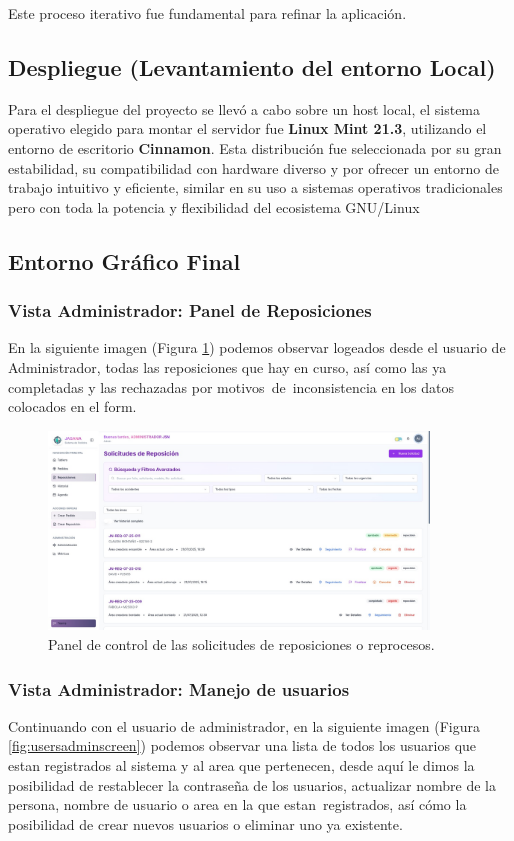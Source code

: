 \documentclass[12pt,letterpaper,spanish]{report}
\begin{document}
Este proceso iterativo fue fundamental para refinar la aplicación.

\subsection{Despliegue (Levantamiento del entorno Local)}
Para el despliegue del proyecto se llevó a cabo sobre un host local, el sistema operativo elegido para montar el servidor fue \textbf{Linux Mint 21.3}, utilizando el entorno de escritorio \textbf{Cinnamon}. Esta distribución fue seleccionada por su gran estabilidad, su compatibilidad con hardware diverso y por ofrecer un entorno de trabajo intuitivo y eficiente, similar en su uso a sistemas operativos tradicionales pero con toda la potencia y flexibilidad del ecosistema GNU/Linux

\subsection{Entorno Gráfico Final}
\subsubsection{Vista Administrador: Panel de Reposiciones}
En la siguiente imagen (Figura \ref{fig:adminscreen}) podemos observar logeados desde el usuario de Administrador, todas las reposiciones que hay en curso, así como las ya completadas y las rechazadas por motivos de inconsistencia en los datos colocados en el form.

\begin{figure}[H]
    \centering
    \includegraphics[width=0.9\textwidth]{pantalla_admin.jpg}
    \caption{Panel de control de las solicitudes de reposiciones o reprocesos.}
    \label{fig:adminscreen}
\end{figure}

\subsubsection{Vista Administrador: Manejo de usuarios}
Continuando con el usuario de administrador, en la siguiente imagen (Figura \ref{fig:usersadminscreen}) podemos observar una lista de todos los usuarios que estan registrados al sistema y al area que pertenecen, desde aquí le dimos la posibilidad de restablecer la contraseña de los usuarios, actualizar nombre de la persona, nombre de usuario o area en la que estan registrados, así cómo la posibilidad de crear nuevos usuarios o eliminar uno ya existente.
\end{document}
